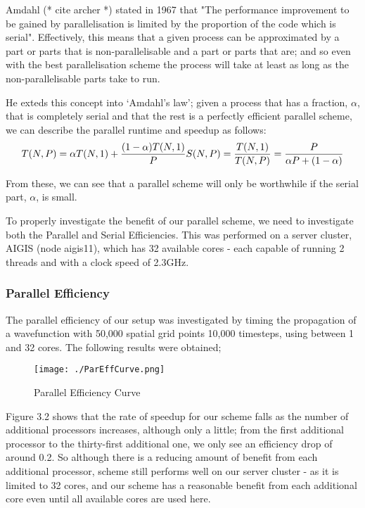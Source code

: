 Amdahl (* cite archer *) stated in 1967 that "The performance improvement to be gained by parallelisation is limited by the proportion of the code which is serial". Effectively, this means that a given process can be approximated by a part or parts that is non-parallelisable and a part or parts that are; and so even with the best parallelisation scheme the process will take at least as long as the non-parallelisable parts take to run. 

He exteds this concept into `Amdahl's law'; given a process that has a fraction, $\alpha$, that is completely serial and that the rest is a perfectly efficient parallel scheme, we can describe the parallel runtime and speedup as follows:
$$
T(N, P)=\alpha T(N, 1)+\frac{(1-\alpha) T(N, 1)}{P}\\
S(N, P)=\frac{T(N, 1)}{T(N, P)}=\frac{P}{\alpha P+(1-\alpha)}
$$

From these, we can see that a parallel scheme will only be worthwhile if the serial part, $\alpha$, is small. 

To properly investigate the benefit of our parallel scheme, we need to investigate both the Parallel and Serial Efficiencies. This was performed on a server cluster, AIGIS (node aigis11), which has 32 available cores - each capable of running 2 threads and with a clock speed of 2.3GHz. 

\subsubsection{Parallel Efficiency}
The parallel efficiency of our setup was investigated by timing the propagation of a wavefunction with 50,000 spatial grid points 10,000 timesteps, using between 1 and 32 cores. The following results were obtained;

\begin{figure}[H]
         \texttt{[image: ./ParEffCurve.png]}
         \centering
         \caption{Parallel Efficiency Curve}
\end{figure}


Figure 3.2 shows that the rate of speedup for our scheme falls as the number of additional processors increases, although only a little; from the first additional processor to the thirty-first additional one, we only see an efficiency drop of around 0.2. So although there is a reducing amount of benefit from each additional processor, scheme still performs well on our server cluster - as it is limited to 32 cores, and our scheme has a reasonable benefit from each additional core even until all available cores are used here.

